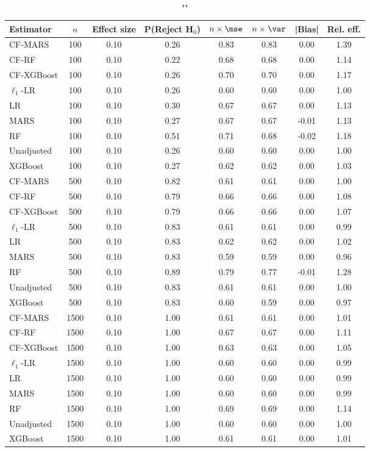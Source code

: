 \begin{table}
\centering
\caption{""}
\begin{tabular}{lccccccc}
\toprule
Estimator & $n$ & Effect size & P(Reject H$_0$) & $n\times\mse$ & $n\times \var$ & |Bias| & Rel. eff.\\ \midrule
CF-MARS & 100 & 0.10 & 0.26 & 0.83 & 0.83 &  0.00 & 1.39 \\ 
CF-RF & 100 & 0.10 & 0.22 & 0.68 & 0.68 &  0.00 & 1.14 \\ 
CF-XGBoost & 100 & 0.10 & 0.26 & 0.70 & 0.70 &  0.00 & 1.17 \\ 
$\ell_1$-LR & 100 & 0.10 & 0.26 & 0.60 & 0.60 &  0.00 & 1.00 \\ 
LR & 100 & 0.10 & 0.30 & 0.67 & 0.67 &  0.00 & 1.13 \\ 
MARS & 100 & 0.10 & 0.27 & 0.67 & 0.67 & -0.01 & 1.13 \\ 
RF & 100 & 0.10 & 0.51 & 0.71 & 0.68 & -0.02 & 1.18 \\ 
Unadjusted & 100 & 0.10 & 0.26 & 0.60 & 0.60 &  0.00 & 1.00 \\ 
XGBoost & 100 & 0.10 & 0.27 & 0.62 & 0.62 &  0.00 & 1.03 \\ \addlinespace 
CF-MARS & 500 & 0.10 & 0.82 & 0.61 & 0.61 &  0.00 & 1.00 \\ 
CF-RF & 500 & 0.10 & 0.79 & 0.66 & 0.66 &  0.00 & 1.08 \\ 
CF-XGBoost & 500 & 0.10 & 0.79 & 0.66 & 0.66 &  0.00 & 1.07 \\ 
$\ell_1$-LR & 500 & 0.10 & 0.83 & 0.61 & 0.61 &  0.00 & 0.99 \\ 
LR & 500 & 0.10 & 0.83 & 0.62 & 0.62 &  0.00 & 1.02 \\ 
MARS & 500 & 0.10 & 0.83 & 0.59 & 0.59 &  0.00 & 0.96 \\ 
RF & 500 & 0.10 & 0.89 & 0.79 & 0.77 & -0.01 & 1.28 \\ 
Unadjusted & 500 & 0.10 & 0.83 & 0.61 & 0.61 &  0.00 & 1.00 \\ 
XGBoost & 500 & 0.10 & 0.83 & 0.60 & 0.59 &  0.00 & 0.97 \\ \addlinespace 
CF-MARS & 1500 & 0.10 & 1.00 & 0.61 & 0.61 &  0.00 & 1.01 \\ 
CF-RF & 1500 & 0.10 & 1.00 & 0.67 & 0.67 &  0.00 & 1.11 \\ 
CF-XGBoost & 1500 & 0.10 & 1.00 & 0.63 & 0.63 &  0.00 & 1.05 \\ 
$\ell_1$-LR & 1500 & 0.10 & 1.00 & 0.60 & 0.60 &  0.00 & 0.99 \\ 
LR & 1500 & 0.10 & 1.00 & 0.60 & 0.60 &  0.00 & 0.99 \\ 
MARS & 1500 & 0.10 & 1.00 & 0.60 & 0.60 &  0.00 & 0.99 \\ 
RF & 1500 & 0.10 & 1.00 & 0.69 & 0.69 &  0.00 & 1.14 \\ 
Unadjusted & 1500 & 0.10 & 1.00 & 0.60 & 0.60 &  0.00 & 1.00 \\ 
XGBoost & 1500 & 0.10 & 1.00 & 0.61 & 0.61 &  0.00 & 1.01 \\
\bottomrule
\end{tabular}
\end{table}

